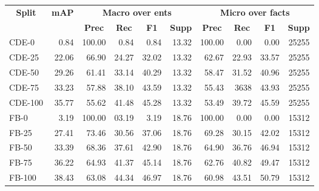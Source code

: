 \begin{tabular}{| l | r | r | r | r | r | r | r | r | r |}
    \hline
    
    \multicolumn{1}{|c|}{\textbf{Split}} &
    \multicolumn{1}{|c|}{\textbf{mAP}} &
    \multicolumn{4}{|c|}{\textbf{Macro over ents}} &
    \multicolumn{4}{|c|}{\textbf{Micro over facts}} \\
    
    \multicolumn{1}{|c|}{} &
    \multicolumn{1}{|c|}{} &
    \multicolumn{1}{|c|}{\textbf{Prec}} &
    \multicolumn{1}{|c|}{\textbf{Rec}} &
    \multicolumn{1}{|c|}{\textbf{F1}} &
    \multicolumn{1}{|c|}{\textbf{Supp}} &
    \multicolumn{1}{|c|}{\textbf{Prec}} &
    \multicolumn{1}{|c|}{\textbf{Rec}} &
    \multicolumn{1}{|c|}{\textbf{F1}} &
    \multicolumn{1}{|c|}{\textbf{Supp}} \\
    
    \hline \hline
    
    CDE-0 & 0.84 &
    100.00 & 0.84 & 0.84 & \num{13.32} &
    100.00 & 0.00 & 0.00 & \num{25255} \\
    
    CDE-25 & 22.06 &
    66.90 & 24.27 & 32.02 & \num{13.32} &
    62.67 & 22.93 & 33.57 & \num{25255} \\
    
    CDE-50 & 29.26 &
    61.41 & 33.14 & 40.29 & \num{13.32} &
    58.47 & 31.52 & 40.96 & \num{25255} \\
    
    CDE-75 & 33.23 &
    57.88 & 38.10 & 43.59 & \num{13.32} &
    55.43 & 3638 & 43.93 & \num{25255} \\
    
    CDE-100 & 35.77 &
    55.62 & 41.48 & 45.28 & \num{13.32} &
    53.49 & 39.72 & 45.59 & \num{25255} \\
    
    \hline
    
    FB-0 & 3.19 &
    100.00 & 03.19 & 3.19 & \num{18.76} &
    100.00 & 0.00 & 0.00 & \num{15312} \\
    
    FB-25 & 27.41 &
    73.46 & 30.56 & 37.06 & \num{18.76} &
    69.28 & 30.15 & 42.02 & \num{15312} \\
    
    FB-50 & 33.39 &
    68.36 & 37.61 & 42.90 & \num{18.76} &
    64.90 & 36.76 & 46.94 & \num{15312} \\
    
    FB-75 & 36.22 &
    64.93 & 41.37 & 45.14 & \num{18.76} &
    62.76 & 40.82 & 49.47 & \num{15312} \\
    
    FB-100 & 38.43 &
    63.08 & 44.34 & 46.97 & \num{18.76} &
    60.98 & 43.51 & 50.79 & \num{15312} \\
    
    \hline
\end{tabular}

